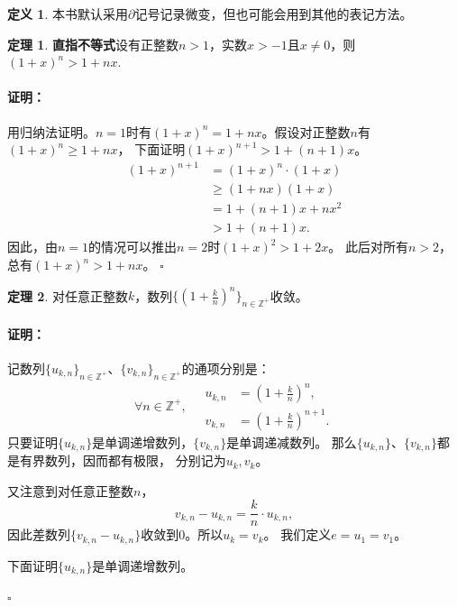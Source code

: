 \documentclass[12pt,UTF8]{ctexbook}
\theoremstyle{definition}
\newtheorem{df}{定义}[section]
\newtheorem{tm}{定理}[section]
\theoremstyle{plain}
\renewenvironment{proof}{\paragraph{\textbf{证明：}}}{\hfill$\square$}
\begin{document}
\begin{appendix}
\begin{df}
本书默认采用$\partial$记号记录微变，但也可能会用到其他的表记方法。
\end{df}

\begin{tm}{\textbf{直指不等式}}\label{tm:b-1-20}
    设有正整数$n > 1$，实数$x > -1$且$x \neq 0$，则$(1 + x)^n > 1 + nx.$
\end{tm}

\begin{proof}
    用归纳法证明。$n = 1$时有$(1 + x)^n = 1 + nx$。假设对正整数$n$有$(1 + x)^n \geqslant 1 + nx$，
    下面证明$(1 + x)^{n+1} > 1 + (n+1)x$。
    \begin{align*}
        (1 + x)^{n+1} &= (1 + x)^{n} \cdot (1 + x)  \\
        &\geqslant (1 + nx)(1 + x)  \\
        &= 1 + (n + 1)x + nx^2  \\
        &> 1 + (n + 1)x.
   \end{align*}
   因此，由$n=1$的情况可以推出$n=2$时$(1 + x)^{2} > 1 + 2x$。
   此后对所有$n>2$，总有$(1 + x)^{n} > 1 + nx$。
\end{proof}

\begin{tm}\label{tm:b-1-30}
    对任意正整数$k$，数列$\{\left(1 + \frac{k}{n}\right)^n\}_{n\in\mathbb{Z}^+}$收敛。
\end{tm}

\begin{proof}
    记数列$\{u_{k,n}\}_{n\in\mathbb{Z}^+}$、$\{v_{k,n}\}_{n\in\mathbb{Z}^+}$的通项分别是：
    $$
    \forall n \in\mathbb{Z}^+, \quad
    \begin{array}{cl}
        u_{k,n} &=  \left(1 + \frac{k}{n}\right)^n, \\
        v_{k,n} &= \left(1 + \frac{k}{n}\right)^{n+1}.
    \end{array}
    $$
    只要证明$\{u_{k,n}\}$是单调递增数列，$\{v_{k,n}\}$是单调递减数列。
    那么$\{u_{k,n}\}$、$\{v_{k,n}\}$都是有界数列，因而都有极限，
    分别记为$u_{k}, v_k$。

    又注意到对任意正整数$n$，
    $$v_{k,n} - u_{k,n} = \frac{k}{n} \cdot u_{k,n}, $$
    因此差数列$\{v_{k,n} - u_{k,n}\}$收敛到$0$。所以$u_k = v_k$。
    我们定义$e = u_1 = v_1$。

    下面证明$\{u_{k,n}\}$是单调递增数列。


\end{proof}
\end{appendix}
\end{document}
